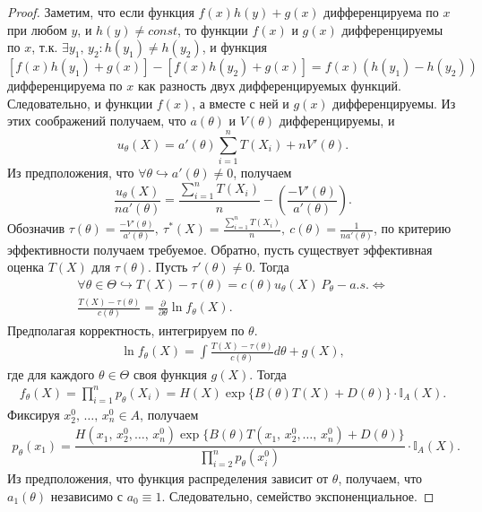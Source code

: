 \begin{proof}
Заметим, что если функция $\displaystyle f( x) h( y) +g( x)$ дифференцируема по $\displaystyle x$ при любом $\displaystyle y$, и $\displaystyle h( y) \ne const$, то функции $\displaystyle f( x)$ и $\displaystyle g( x)$ дифференцируемы по $\displaystyle x$, т.к. $\displaystyle \exists y_{1},\, y_{2} :h( y_{1}) \ne h( y_{2})$, и функция $\displaystyle [ f( x) h( y_{1}) +g( x)] -[ f( x) h( y_{2}) +g( x)] =f( x)( h( y_{1}) -h( y_{2}))$ дифференцируема по $\displaystyle x$ как разность двух дифференцируемых функций. Следовательно, и функции $\displaystyle f( x)$, а вместе с ней и $\displaystyle g( x)$ дифференцируемы.
Из этих соображений получаем, что $\displaystyle a( \theta )$ и $\displaystyle V( \theta )$ дифференцируемы, и
\begin{equation*}
u_{\theta }( X) =a'( \theta )\sum _{i=1}^{n} T( X_{i}) +nV'( \theta ) .
\end{equation*}
Из предположения, что $\displaystyle \forall \theta \hookrightarrow a'( \theta ) \neq 0$, получаем
\begin{equation*}
\frac{u_{\theta }( X)}{na'( \theta )} =\frac{\sum _{i=1}^{n} T( X_{i})}{n} -\left(\frac{-V'( \theta )}{a'( \theta )}\right) .
\end{equation*}
Обозначив $\displaystyle \tau ( \theta ) =\frac{-V'( \theta )}{a'( \theta )} ,\ \tau ^{*}( X) =\frac{\sum _{i=1}^{n} T( X_{i})}{n} ,\ c( \theta ) =\frac{1}{na'( \theta )}$, по критерию эффективности получаем требуемое.
Обратно, пусть существует эффективная оценка $\displaystyle T( X)$ для $\displaystyle \tau ( \theta )$. Пусть $\displaystyle \tau '( \theta ) \neq 0$. Тогда
\begin{gather*}
    \forall \theta \in \Theta \hookrightarrow T(X) - \tau(\theta) = c(\theta)u_\theta(X)\ P_\theta-a.s. \Leftrightarrow\\
    \frac{T(X) - \tau(\theta)}{c(\theta)} = \frac{\partial}{\partial\theta}\ln f_\theta(X).
\end{gather*}
Предполагая корректность, интегрируем по $\theta$.
\begin{gather*}
    \ln f_\theta(X) = \int\frac{T(X)-\tau(\theta)}{c(\theta)}d\theta + g(X),
\end{gather*}
где для каждого $\theta \in \Theta$ своя функция $g(X)$. Тогда
\begin{gather*}
    f_\theta(X) = \prod_{i=1}^n p_\theta(X_i) = H(X)\exp\{B(\theta)T(X) + D(\theta)\}\cdot\mathbb{I}_A(X).
\end{gather*}
Фиксируя $x_2^0,\, \ldots,\, x_n^0 \in A$, получаем
\begin{gather*}
    p_\theta(x_1) = \dfrac{H(x_1,\, x_2^0, \ldots,\, x_n^0)\exp\{B(\theta)T(x_1,\, x_2^0, \ldots,\, x_n^0) + D(\theta)\}}{\prod_{i=2}^n p_\theta(x_i^0)}\cdot\mathbb{I}_A(X).
\end{gather*}
Из предположения, что функция распределения зависит от $\theta$, получаем, что $a_1(\theta)$ независимо с $a_0 \equiv 1$. Следовательно, семейство экспоненциальное.
\end{proof}

